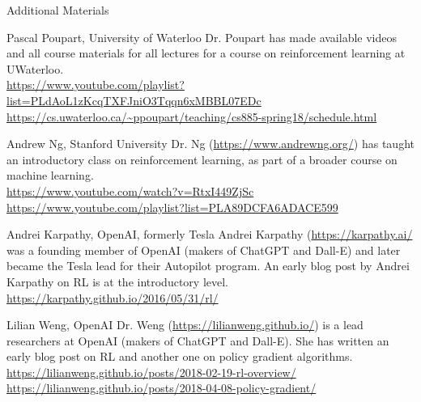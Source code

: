 \documentclass[ignorenonframetext,xcolor=x11names]{beamer}
\begin{document}
\begin{frame}[allowframebreaks]{Additional Materials}
\begin{block}{Pascal Poupart, University of Waterloo}
Dr. Poupart has made available videos and all course materials for all lectures for a course on reinforcement learning at UWaterloo. \\
\vspace{.5\baselineskip}
\url{https://www.youtube.com/playlist?list=PLdAoL1zKcqTXFJniO3Tqqn6xMBBL07EDc} \\
\vspace{.5\baselineskip}
\url{https://cs.uwaterloo.ca/~ppoupart/teaching/cs885-spring18/schedule.html}
\end{block}

\begin{block}{Andrew Ng, Stanford University}
Dr. Ng (\url{https://www.andrewng.org/}) has taught an introductory class on reinforcement learning, as part of a broader course on machine learning. \\
\vspace{\baselineskip}
\url{https://www.youtube.com/watch?v=RtxI449ZjSc} \\
\vspace{.5\baselineskip}
\url{https://www.youtube.com/playlist?list=PLA89DCFA6ADACE599}
\end{block}

\begin{block}{Andrei Karpathy, OpenAI, formerly Tesla}
Andrei Karpathy (\url{https://karpathy.ai/} was a founding member of OpenAI (makers of ChatGPT and Dall-E) and later became the Tesla lead for their Autopilot program. An early blog post by Andrei Karpathy on RL is at the introductory level. \\
\vspace{.5\baselineskip}
\url{https://karpathy.github.io/2016/05/31/rl/}
\end{block}

\begin{block}{Lilian Weng, OpenAI}
Dr. Weng (\url{https://lilianweng.github.io/}) is a lead researchers at OpenAI (makers of ChatGPT and Dall-E). She has written an early blog post on RL and another one on policy gradient algorithms. \\
\vspace{.5\baselineskip}
\url{https://lilianweng.github.io/posts/2018-02-19-rl-overview/}\\
\vspace{.5\baselineskip}
\url{https://lilianweng.github.io/posts/2018-04-08-policy-gradient/}
\end{block}


\end{frame}
\end{document}
